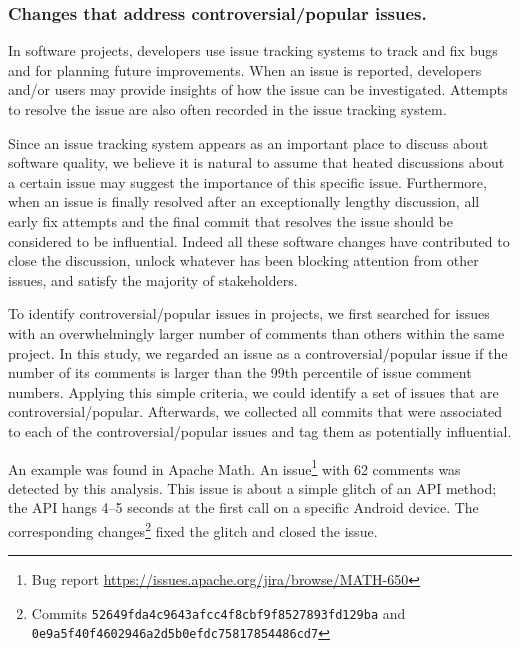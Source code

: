 \subsubsection{Changes that address controversial/popular issues.}
\label{sec:blocking}
In software projects, developers use issue tracking systems
to track and fix bugs and for planning
future improvements. When an issue is reported, developers and/or
users may provide insights of how the issue can be investigated. 
Attempts to resolve the issue are also often recorded in the issue tracking
system.

Since an issue tracking system appears as an important place to discuss
about software quality, we believe it is natural to assume that heated
discussions about a certain issue may suggest the importance of this
specific issue. Furthermore, when an issue is finally resolved after an exceptionally
lengthy discussion, all early fix attempts and the final commit that resolves
the issue should be considered to be influential. Indeed all these
software changes have contributed to close the discussion, unlock whatever
has been blocking attention from other issues, and satisfy the majority of
stakeholders. 

To identify controversial/popular issues in projects, we first searched for
issues with an overwhelmingly larger number of comments than others within the
same project. In this study, we regarded an issue as a controversial/popular issue if the
number of its comments is larger than the 99th percentile of issue comment
numbers. Applying this simple criteria, we could identify a set of issues that
 are controversial/popular. Afterwards, we collected all commits that were
associated to each of the controversial/popular issues and tag them as potentially
influential.



An example was found in Apache Math. An
issue\footnote{Bug report \url{https://issues.apache.org/jira/browse/MATH-650}} with 62
comments was detected by this analysis. This issue is about a simple glitch of
an API method; the API hangs 4--5 seconds at the first call on a specific
Android device. The corresponding
changes\footnote{Commits {\tt\small 52649fda4c9643afcc4f8cbf9f8527893fd129ba} and\\
{\tt\small 0e9a5f40f4602946a2d5b0efdc75817854486cd7}} fixed the glitch and
closed the issue.

